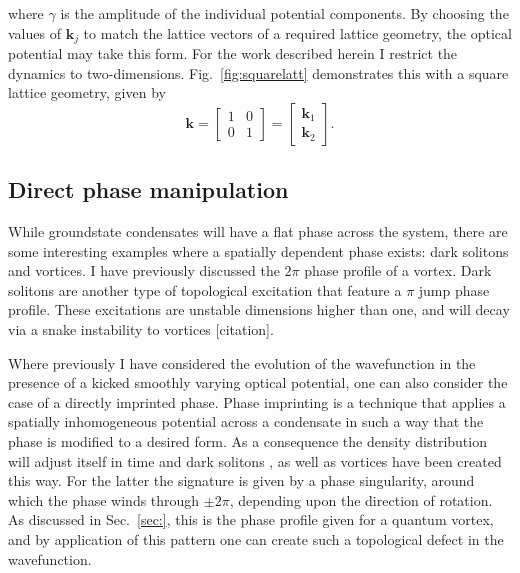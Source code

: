 {\begin{equation}
\end{equation}
where $\gamma$ is the amplitude of the individual potential components. By choosing the values of $\mathbf{k}_j$ to match the lattice vectors of a required lattice geometry, the optical potential may take this form. For the work described herein I restrict the dynamics to two-dimensions. Fig.~\ref{fig:squarelatt} demonstrates this with a square lattice geometry, given by
\begin{equation}\label{eqn:sqlatt}
    \mathbf{k} =
    \begin{bmatrix}
     1 & 0 \\
     0 & 1
    \end{bmatrix} =
    \begin{bmatrix}
     \mathbf{k}_1  \\
     \mathbf{k}_2
    \end{bmatrix}.
\end{equation}
\fi

\subsection{Direct phase manipulation}\label{sec:phase}

While groundstate condensates will have a flat phase across the system, there are some interesting examples where a spatially dependent phase exists: dark solitons and vortices. I have previously discussed the $2\pi$ phase profile of a vortex. Dark solitons are another type of topological excitation that feature a $\pi$ jump phase profile. These excitations are unstable dimensions higher than one, and will decay via a snake instability to vortices [citation].

Where previously I have considered the evolution of the wavefunction in the presence of a kicked smoothly varying optical potential, one can also consider the case of a directly imprinted phase. Phase imprinting is a technique that applies a spatially inhomogeneous potential across a condensate in such a way that the phase is modified to a desired form. As a consequence the density distribution will adjust itself in time and dark solitons \cite{BEC:Denschlag_science_2000}, as well as vortices \cite{Vtx:Dobrek_pra_1999} have been created this way. For the latter the signature is given by a phase singularity, around which the phase winds through $\pm 2\pi$, depending upon the direction of rotation. As discussed in Sec.~\ref{sec:}, this is the phase profile given for a quantum vortex, and by application of this pattern one can create such a topological defect in the wavefunction.

}
